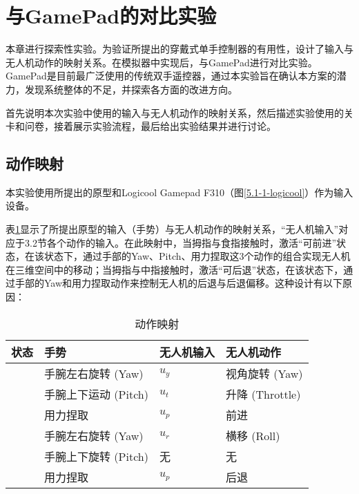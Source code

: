 \ifx\allfiles\undefined


\else
\fi

\section{与GamePad的对比实验}
 
本章进行探索性实验。为验证所提出的穿戴式单手控制器的有用性，设计了输入与无人机动作的映射关系。在模拟器中实现后，与GamePad进行对比实验。GamePad是目前最广泛使用的传统双手遥控器，通过本实验旨在确认本方案的潜力，发现系统整体的不足，并探索各方面的改进方向。

首先说明本次实验中使用的输入与无人机动作的映射关系，然后描述实验使用的关卡和问卷，接着展示实验流程，最后给出实验结果并进行讨论。

\subsection{动作映射}

本实验使用所提出的原型和Logicool Gamepad F310（图\ref{5.1-1-logicool}）作为输入设备。

表\ref{tab:gesture}显示了所提出原型的输入（手势）与无人机动作的映射关系，“无人机输入”对应于3.2节各个动作的输入。在此映射中，当拇指与食指接触时，激活“可前进”状态，在该状态下，通过手部的Yaw、Pitch、用力捏取这3个动作的组合实现无人机在三维空间中的移动；当拇指与中指接触时，激活“可后退”状态，在该状态下，通过手部的Yaw和用力捏取动作来控制无人机的后退与后退偏移。这种设计有以下原因：

\begin{table}[b]
    \centering
    \caption{\label{tab:gesture}动作映射}
    \begin{tabular}{>{\centering\arraybackslash}p{1.5cm} >{\centering\arraybackslash}p{3.8cm} >{\centering\arraybackslash}p{2cm} >{\centering\arraybackslash}p{3cm}}
        \toprule
        \textbf{状态} & \textbf{手势}           & \textbf{无人机输入} & \textbf{无人机动作} \\
        \midrule
        \multirow{3}{3cm}{可前进}
                      & 手腕左右旋转 (Yaw)       & \(u_y\)        & 视角旋转 (Yaw)    \\
                      & 手腕上下运动 (Pitch)     & \(u_t\)        & 升降 (Throttle) \\
                      & 用力捏取               & \(u_p\)        & 前进            \\
        \midrule
        \multirow{3}{3cm}{可后退}
                      & 手腕左右旋转 (Yaw)       & \(u_r\)        & 横移 (Roll)     \\
                      & 手腕上下旋转 (Pitch)     & 无               & 无             \\
                      & 用力捏取               & \(u_p\)        & 后退            \\
        \bottomrule
    \end{tabular}
\end{table}

